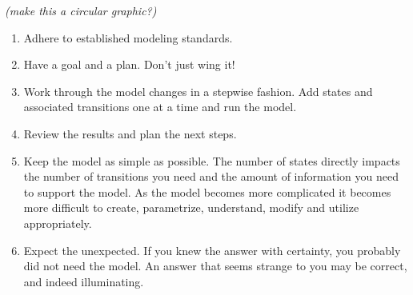 \documentclass[
]{article}
\begin{document}
\emph{(make this a circular graphic?)}

\begin{enumerate}
\def\labelenumi{\arabic{enumi}.}
\item
  Adhere to established modeling standards.
\item
  Have a goal and a plan. Don't just wing it!
\item
  Work through the model changes in a stepwise fashion. Add states and
  associated transitions one at a time and run the model.
\item
  Review the results and plan the next steps.
\item
  Keep the model as simple as possible. The number of states directly
  impacts the number of transitions you need and the amount of
  information you need to support the model. As the model becomes more
  complicated it becomes more difficult to create, parametrize,
  understand, modify and utilize appropriately.
\item
  Expect the unexpected. If you knew the answer with certainty, you
  probably did not need the model. An answer that seems strange to you
  may be correct, and indeed illuminating.
\end{enumerate}
\end{document}
